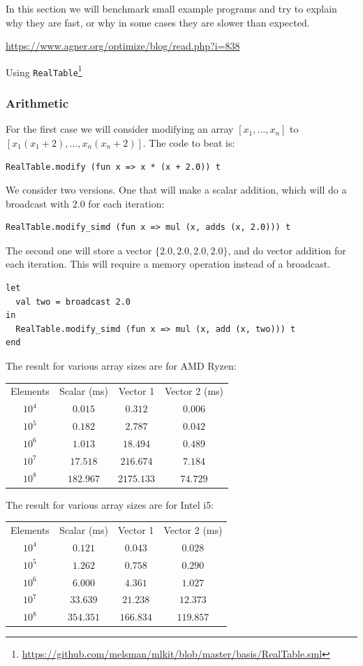 \documentclass{article}
\begin{document}
In this section we will benchmark small example programs and try to explain why they are fast, or why in some cases they are slower than expected.

\url{https://www.agner.org/optimize/blog/read.php?i=838}

Using \texttt{RealTable}\footnote{\url{https://github.com/melsman/mlkit/blob/master/basis/RealTable.sml}}

\subsubsection{Arithmetic}

For the first case we will consider modifying an array $[x_1, \ldots, x_n]$ to $[x_1(x_1 + 2), \ldots, x_n(x_n + 2)]$. The code to beat is:
\begin{lstlisting}
RealTable.modify (fun x => x * (x + 2.0)) t
\end{lstlisting}

We consider two versions. One that will make a scalar addition, which will do a broadcast with $2.0$ for each iteration:
\begin{lstlisting}
RealTable.modify_simd (fun x => mul (x, adds (x, 2.0))) t
\end{lstlisting}
The second one will store a vector $\{ 2.0, 2.0, 2.0, 2.0 \}$, and do vector addition for each iteration. This will require a memory operation instead of a broadcast.
\begin{lstlisting}
let
  val two = broadcast 2.0
in
  RealTable.modify_simd (fun x => mul (x, add (x, two))) t
end
\end{lstlisting}
The result for various array sizes are for AMD Ryzen:
\begin{center}
\begin{tabular}{ c c c c }
    Elements & Scalar (ms) & Vector 1 & Vector 2 (ms) \\
    $10^4$ & $0.015$ & $0.312$ & $0.006$ \\
    $10^5$ & $0.182$ & $2.787$ & $0.042$ \\
    $10^6$ & $1.013$ & $18.494$ & $0.489$ \\
    $10^7$ & $17.518$ & $216.674$ & $7.184$ \\
    $10^8$ & $182.967$ & $2175.133$ & $74.729$ \\
\end{tabular}
\end{center}

The result for various array sizes are for Intel i5:
\begin{center}
\begin{tabular}{ c c c c }
    Elements & Scalar (ms) & Vector 1 & Vector 2 (ms) \\
    $10^4$ & $0.121$ & $0.043$ & $0.028$ \\
    $10^5$ & $1.262$ & $0.758$ & $0.290$ \\
    $10^6$ & $6.000$ & $4.361$ & $1.027$ \\
    $10^7$ & $33.639$ & $21.238$ & $12.373$ \\
    $10^8$ & $354.351$ & $166.834$ & $119.857$ \\
\end{tabular}
\end{center}
\end{document}
